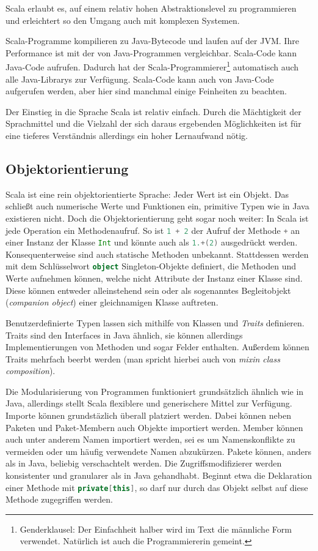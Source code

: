 \documentclass[a4paper, 12pt, hidelinks, listof=totoc, listoftables=totoc, bibliography=totoc]{scrreprt}
\newcommand{\scala}[1]{\lstinline[language=Scala, style=inline]|#1|}
\begin{document}
Scala erlaubt es, auf einem relativ hohen Abstraktionslevel zu programmieren und erleichtert so den Umgang auch mit komplexen Systemen.

Scala-Programme kompilieren zu Java-Bytecode und laufen auf der \ac{JVM}. Ihre Performance ist mit der von Java-Programmen vergleichbar. Scala-Code kann Java-Code aufrufen. Dadurch hat der Scala-Programmierer\footnote{Genderklausel: Der Einfachheit halber wird im Text die männliche Form verwendet. Natürlich ist auch die Programmiererin gemeint.} automatisch auch alle Java-Librarys zur Verfügung. Scala-Code kann auch von Java-Code aufgerufen werden, aber hier sind manchmal einige Feinheiten zu beachten.\cite[S. 13 ff.]{odersky2008.PIS}

Der Einstieg in die Sprache Scala ist relativ einfach. Durch die Mächtigkeit der Sprachmittel und die Vielzahl der sich daraus ergebenden Möglichkeiten ist für eine tieferes Verständnis allerdings ein hoher Lernaufwand nötig.



\subsection{Objektorientierung}

Scala ist eine rein objektorientierte Sprache: Jeder Wert ist ein Objekt. Das schließt auch numerische Werte und Funktionen ein, primitive Typen wie in Java existieren nicht. Doch die Objektorientierung geht sogar noch weiter: In Scala ist jede Operation ein Methodenaufruf. So ist \scala{1 + 2} der Aufruf der Methode \scala{+} an einer Instanz der Klasse \scala{Int} und könnte auch als \scala{1.+(2)} ausgedrückt werden. Konsequenterweise sind auch statische Methoden unbekannt. Stattdessen werden mit dem Schlüsselwort \scala{object} Singleton-Objekte definiert, die Methoden und Werte aufnehmen können, welche nicht Attribute der Instanz einer Klasse sind. Diese können entweder alleinstehend sein oder als sogenanntes Begleitobjekt (\emph{companion object}) einer gleichnamigen Klasse auftreten.

Benutzerdefinierte Typen lassen sich mithilfe von Klassen und \emph{Traits} definieren. Traits sind den Interfaces in Java ähnlich, sie können allerdings Implementierungen von Methoden und sogar Felder enthalten. Außerdem können Traits mehrfach beerbt werden (man spricht hierbei auch von \emph{mixin class composition}).

Die Modularisierung von Programmen funktioniert grundsätzlich ähnlich wie in Java, allerdings stellt Scala flexiblere und generischere Mittel zur Verfügung. Importe können grundstäzlich überall platziert werden. Dabei können neben Paketen und Paket-Membern auch Objekte importiert werden. Member können auch unter anderem Namen importiert werden, sei es um Namenskonflikte zu vermeiden oder um häufig verwendete Namen abzukürzen.
Pakete können, anders als in Java, beliebig verschachtelt werden. Die Zugriffsmodifizierer werden konsistenter und granularer als in Java gehandhabt. Beginnt etwa die Deklaration einer Methode mit \scala{private[this]}, so darf nur durch das Objekt selbst auf diese Methode zugegriffen werden.\cite[S. 9 f., S. 233 ff.]{odersky2008.PIS}\cite{scala-lang.ATS}
\end{document}
